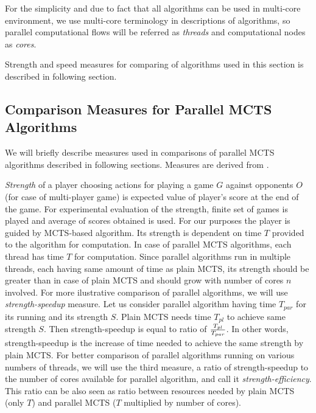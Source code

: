 For the simplicity and due to fact that all algorithms can be used in multi-core environment, we 
use multi-core terminology in descriptions of algorithms, so parallel
computational flows will be referred as \emph{threads} and computational nodes as \emph{cores}.

Strength and speed measures for comparing of algorithms used in this section is described in
following section.

\subsection{Comparison Measures for Parallel MCTS Algorithms}
\label{sec_measures_parallel}

We will briefly describe measures used in comparisons of parallel MCTS algorithms described in
following sections. Measures are derived from \cite{Chaslot2008}.

\emph{Strength} of a player choosing actions for playing a game $G$ against
opponents $O$ (for case of multi-player game) 
is expected value of player's score at the end of the game. For experimental evaluation of the
strength, finite set of games is played and average
 of scores obtained is used. For our
purposes the player is guided by MCTS-based algorithm. Its strength is dependent on time $T$
provided to the algorithm for computation. In case of parallel MCTS algorithms, each thread has
time $T$ for computation. Since parallel algorithms run in multiple threads, each having same
amount of time as plain MCTS, its strength should be greater than in case of plain MCTS and should 
grow with number of cores $n$ involved. For more ilustrative comparison of parallel algorithms,
we will use \emph{strength-speedup} measure. Let us consider parallel algorithm having time
$T_{par}$
for its running and its strength $S$. Plain MCTS needs time $T_{pl}$ to achieve same strength
$S$. Then strength-speedup is equal to ratio of $T_{pl} \over T_{par}$. In other words,
strength-speedup is the increase of time needed to achieve the same strength by plain MCTS.
For better comparison of parallel algorithms running on various numbers of threads, we will use 
the third measure, a ratio of strength-speedup to the number of cores available for parallel
algorithm, and call it \emph{strength-efficiency}. This ratio can be also seen as ratio between
resources needed by plain MCTS (only $T$) and parallel MCTS ($T$ multiplied by number of
cores).

